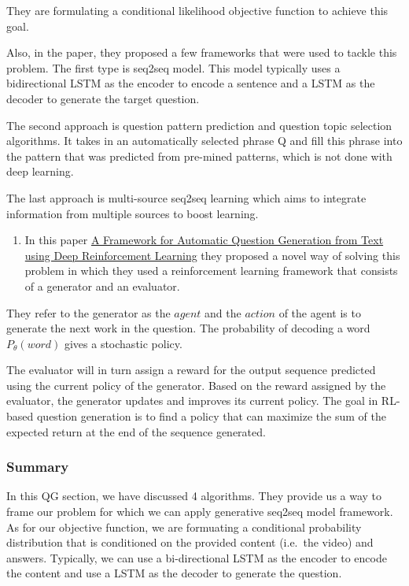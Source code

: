 \documentclass[]{book}
\providecommand{\tightlist}{%
  \setlength{\itemsep}{0pt}\setlength{\parskip}{0pt}}
\theoremstyle{definition}
\theoremstyle{definition}
\theoremstyle{definition}
\theoremstyle{remark}
\begin{document}
They are formulating a conditional likelihood objective function to
achieve this goal.

Also, in the paper, they proposed a few frameworks that were used to
tackle this problem. The first type is seq2seq model. This model
typically uses a bidirectional LSTM as the encoder to encode a sentence
and a LSTM as the decoder to generate the target question.

The second approach is question pattern prediction and question topic
selection algorithms. It takes in an automatically selected phrase Q and
fill this phrase into the pattern that was predicted from pre-mined
patterns, which is not done with deep learning.

The last approach is multi-source seq2seq learning which aims to
integrate information from multiple sources to boost learning.

\begin{enumerate}
\def\labelenumi{\arabic{enumi}.}
\setcounter{enumi}{3}
\tightlist
\item
  In this paper \href{https://arxiv.org/pdf/1808.04961.pdf}{A Framework
  for Automatic Question Generation from Text using Deep Reinforcement
  Learning} they proposed a novel way of solving this problem in which
  they used a reinforcement learning framework that consists of a
  generator and an evaluator.
\end{enumerate}

They refer to the generator as the \(agent\) and the \(action\) of the
agent is to generate the next work in the question. The probability of
decoding a word \(P_{\theta}(word)\) gives a stochastic policy.

The evaluator will in turn assign a reward for the output sequence
predicted using the current policy of the generator. Based on the reward
assigned by the evaluator, the generator updates and improves its
current policy. The goal in RL-based question generation is to find a
policy that can maximize the sum of the expected return at the end of
the sequence generated.

\subsubsection{Summary}\label{summary}

In this QG section, we have discussed 4 algorithms. They provide us a
way to frame our problem for which we can apply generative seq2seq model
framework. As for our objective function, we are formuating a
conditional probability distribution that is conditioned on the provided
content (i.e.~the video) and answers. Typically, we can use a
bi-directional LSTM as the encoder to encode the content and use a LSTM
as the decoder to generate the question.
\end{document}

